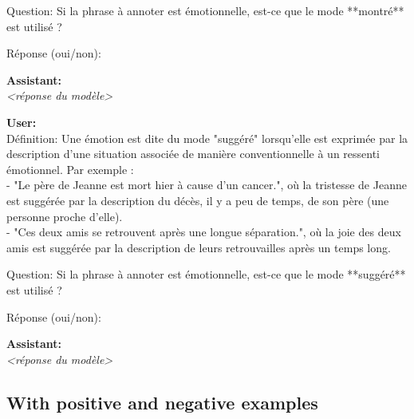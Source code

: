 {Question: Si la phrase à annoter est émotionnelle, est-ce que le mode **montré** est utilisé ?

Réponse (oui/non):

\textbf{Assistant:}\\
\textit{<réponse du modèle>}

\textbf{User:}\\
Définition: Une émotion est dite du mode "suggéré" lorsqu'elle est exprimée par la description d'une situation associée de manière conventionnelle à un ressenti émotionnel. Par exemple :\\
- "Le père de Jeanne est mort hier à cause d'un cancer.", où la tristesse de Jeanne est suggérée par la description du décès, il y a peu de temps, de son père (une personne proche d'elle).\\
- "Ces deux amis se retrouvent après une longue séparation.", où la joie des deux amis est suggérée par la description de leurs retrouvailles après un temps long.

Question: Si la phrase à annoter est émotionnelle, est-ce que le mode **suggéré** est utilisé ?

Réponse (oui/non):

\textbf{Assistant:}\\
\textit{<réponse du modèle>}
}










\subsection{With positive and negative examples}
\label{subsec:details_avec_contre_exemples}

